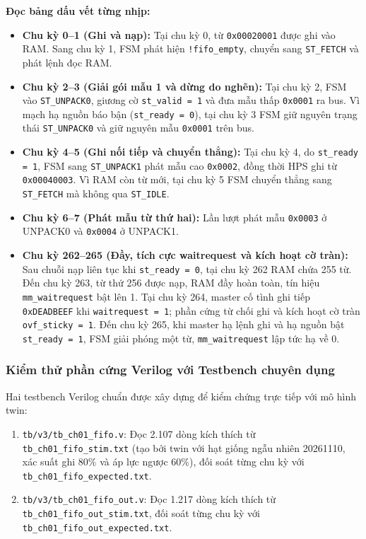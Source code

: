 \textbf{Đọc bảng dấu vết từng nhịp:}
\begin{itemize}[leftmargin=1.5em, itemsep=2pt]
    \item \textbf{Chu kỳ 0--1 (Ghi và nạp):} Tại chu kỳ 0, từ \texttt{0x00020001} được ghi vào RAM. Sang chu kỳ 1, FSM phát hiện \texttt{!fifo\_empty}, chuyển sang \texttt{ST\_FETCH} và phát lệnh đọc RAM.
    \item \textbf{Chu kỳ 2--3 (Giải gói mẫu 1 và dừng do nghẽn):} Tại chu kỳ 2, FSM vào \texttt{ST\_UNPACK0}, giương cờ \texttt{st\_valid = 1} và đưa mẫu thấp \texttt{0x0001} ra bus. Vì mạch hạ nguồn báo bận (\texttt{st\_ready = 0}), tại chu kỳ 3 FSM giữ nguyên trạng thái \texttt{ST\_UNPACK0} và giữ nguyên mẫu \texttt{0x0001} trên bus.
    \item \textbf{Chu kỳ 4--5 (Ghi nối tiếp và chuyển thẳng):} Tại chu kỳ 4, do \texttt{st\_ready = 1}, FSM sang \texttt{ST\_UNPACK1} phát mẫu cao \texttt{0x0002}, đồng thời HPS ghi từ \texttt{0x00040003}. Vì RAM còn từ mới, tại chu kỳ 5 FSM chuyển thẳng sang \texttt{ST\_FETCH} mà không qua \texttt{ST\_IDLE}.
    \item \textbf{Chu kỳ 6--7 (Phát mẫu từ thứ hai):} Lần lượt phát mẫu \texttt{0x0003} ở UNPACK0 và \texttt{0x0004} ở UNPACK1.
    \item \textbf{Chu kỳ 262--265 (Đầy, tích cực waitrequest và kích hoạt cờ tràn):} Sau chuỗi nạp liên tục khi \texttt{st\_ready = 0}, tại chu kỳ 262 RAM chứa 255 từ. Đến chu kỳ 263, từ thứ 256 được nạp, RAM đầy hoàn toàn, tín hiệu \texttt{mm\_waitrequest} bật lên 1. Tại chu kỳ 264, master cố tình ghi tiếp \texttt{0xDEADBEEF} khi \texttt{waitrequest = 1}; phần cứng từ chối ghi và kích hoạt cờ tràn \texttt{ovf\_sticky = 1}. Đến chu kỳ 265, khi master hạ lệnh ghi và hạ nguồn bật \texttt{st\_ready = 1}, FSM giải phóng một từ, \texttt{mm\_waitrequest} lập tức hạ về 0.
\end{itemize}

\subsubsection*{Kiểm thử phần cứng Verilog với Testbench chuyên dụng}
Hai testbench Verilog chuẩn được xây dựng để kiểm chứng trực tiếp với mô hình twin:
\begin{enumerate}[leftmargin=1.5em, itemsep=2pt]
    \item \texttt{tb/v3/tb\_ch01\_fifo.v}: Đọc 2.107 dòng kích thích từ \texttt{tb\_ch01\_fifo\_stim.txt} (tạo bởi twin với hạt giống ngẫu nhiên 20261110, xác suất ghi $80\%$ và áp lực ngược $60\%$), đối soát từng chu kỳ với \texttt{tb\_ch01\_fifo\_expected.txt}.
    \item \texttt{tb/v3/tb\_ch01\_fifo\_out.v}: Đọc 1.217 dòng kích thích từ \texttt{tb\_ch01\_fifo\_out\_stim.txt}, đối soát từng chu kỳ với \texttt{tb\_ch01\_fifo\_out\_expected.txt}.
\end{enumerate}


